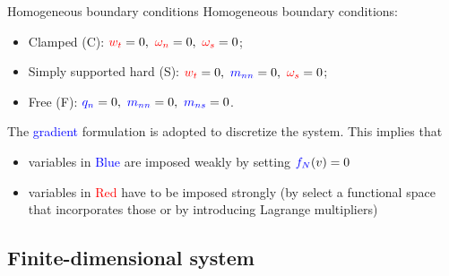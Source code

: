 \documentclass{beamer}
\begin{document}
\begin{frame}{Homogeneous boundary conditions}
Homogeneous boundary conditions:
\begin{itemize}
	\item Clamped (C): $\textcolor{red}{w_t} = 0, \ \textcolor{red}{\omega_{n}} = 0, \ \textcolor{red}{\omega_{s}}=0$;
	\item Simply supported hard (S): $\textcolor{red}{w_t} = 0, \ \textcolor{blue}{m_{nn}} = 0, \ \textcolor{red}{\omega_{s}}=0$;
	\item Free (F): $ \textcolor{blue}{q_{n}} = 0, \ \textcolor{blue}{m_{nn}}=0, \ \textcolor{blue}{m_{ns}} = 0$.
\end{itemize}
\vspace{.5cm}
The \textcolor{blue}{gradient} formulation is adopted to discretize the system. This implies that 
\begin{itemize}
\item variables in \textcolor{blue}{Blue} are imposed weakly by setting  $\textcolor{blue}{f_N}(v) = 0$
\item variables in \textcolor{red}{Red} have to be imposed strongly (by select a functional space that incorporates those or by introducing Lagrange multipliers)
\end{itemize}
\end{frame}

\subsection{Finite-dimensional system}
\end{document}
